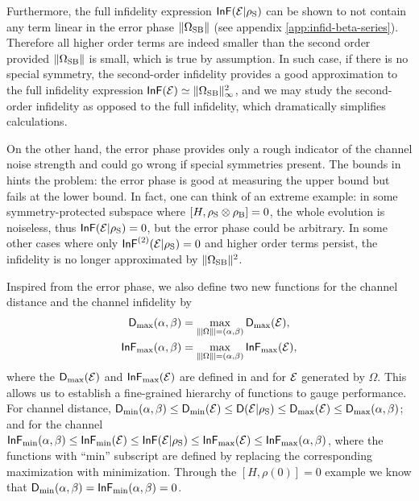 \documentclass[aps,pra,reprint,superscriptaddress]{revtex4-2}
\begin{document}
Furthermore, the full infidelity expression $\operatorname{\mathsf{InF}}(\mathcal{E}|\rho_{\mathrm{S}})$ can be shown to not contain any term linear in the error phase $\Vert {\Omega_{\mathrm{SB}}} \Vert$  (see appendix \ref{app:infid-beta-series}). Therefore all higher order terms are indeed smaller than the second order provided $\Vert {\Omega_{\mathrm{SB}}} \Vert$ is small,
which is true by assumption. 
In such case, if there is no special symmetry, the second-order infidelity provides a good approximation to the full infidelity expression $\operatorname{\mathsf{InF}}(\mathcal{E})\simeq \Vert {\Omega_{\mathrm{SB}}} \Vert_\infty^2$, and we may study the second-order infidelity as opposed to the full infidelity, which dramatically simplifies  calculations.

On the other hand, the error phase provides only a rough indicator of the 
channel noise strength and could go wrong if special symmetries present.
The bounds in  hints the problem: the error phase is good at measuring the upper bound but fails at the lower bound. 
In fact, one can think of an extreme example: in some symmetry-protected subspace where $[H,\rho_\mathrm{S}\otimes\rho_\mathrm{B}]=0$, the whole evolution is noiseless, 
thus $\operatorname{\mathsf{InF}}(\mathcal{E}|\rho_\mathrm{S})=0$, but the error phase could be arbitrary. In some other cases where only $\operatorname{\mathsf{InF}}^{(2)}(\mathcal{E}|\rho_{\mathrm{S}}) = 0$ and higher order terms persist, the infidelity is no longer approximated by $\Vert {\Omega_{\mathrm{SB}}} \Vert^2$.

Inspired from the error phase, we also define two new functions for the channel distance and the channel infidelity by 
\begin{align}
    \trdis_{\max}(\alpha,\beta)&= \max_{\opnorm{\Omega}=(\alpha,\beta)}\trdis_{\max}(\cE),\\
    \infid_{\max}(\alpha,\beta)&= \max_{\opnorm{\Omega}=(\alpha,\beta)}\infid_{\max}(\cE),
\end{align}
where the $\operatorname{\mathsf{D}}_{\max}(\mathcal{E})$ and $\operatorname{\mathsf{InF}}_{\max}(\mathcal{E})$ are defined in  and  for 
$\mathcal{E}$ generated by $\Omega$.
This allows us to establish a fine-grained hierarchy of functions to gauge performance. For channel distance, $\operatorname{\mathsf{D}}_{\min}(\alpha,\beta) \le  \operatorname{\mathsf{D}}_{\min}(\mathcal{E}) \le \operatorname{\mathsf{D}}(\mathcal{E}|\rho_{\mathrm{S}}) \le \operatorname{\mathsf{D}}_{\max}(\mathcal{E}) \le  \operatorname{\mathsf{D}}_{\max}(\alpha,\beta)$;
 and for the channel $\operatorname{\mathsf{InF}}_{\min}(\alpha,\beta) \le  \operatorname{\mathsf{InF}}_{\min}(\mathcal{E}) \le \operatorname{\mathsf{InF}}(\mathcal{E}|\rho_{\mathrm{S}}) \le \operatorname{\mathsf{InF}}_{\max}(\mathcal{E}) \le  \operatorname{\mathsf{InF}}_{\max}(\alpha,\beta)$,
where  the functions with ``min'' subscript are defined by replacing the corresponding maximization with minimization. 
Through the $[H,\rho(0)]=0$ example we know that 
$\operatorname{\mathsf{D}}_{\min}(\alpha,\beta) = \operatorname{\mathsf{InF}}_{\min}(\alpha,\beta) =0$.
\end{document}
